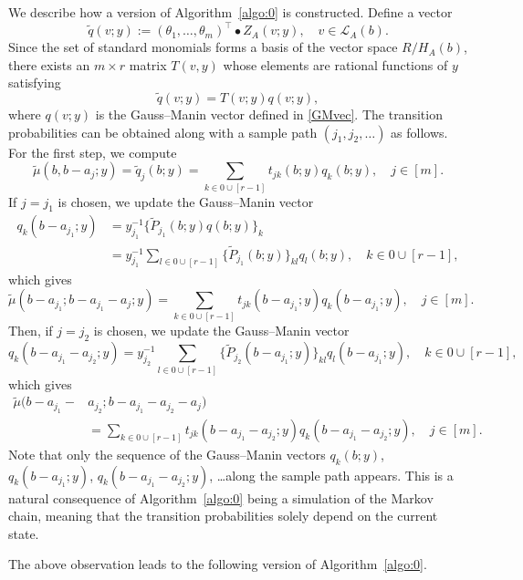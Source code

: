 \documentclass[a4paper,12pt]{article}
\theoremstyle{plain}
\theoremstyle{remark}
\begin{document}
We describe how a version of Algorithm~\ref{algo:0} is constructed.
Define a vector
\[
  \tilde{q}(v;y):=(\theta_1,\ldots,\theta_m)^\top\bullet Z_A(v;y),
  \quad v\in\mathcal{L}_A(b).
\]
Since the set of standard monomials forms a basis of the vector
space $R/H_A(b)$, there exists an $m\times r$ matrix $T(v,y)$
whose elements are rational functions of $y$ satisfying
\[
  \tilde{q}(v;y)=T(v;y)q(v;y),
\]
where $q(v;y)$ is the Gauss--Manin vector defined in \eqref{GMvec}.
The transition probabilities can be obtained along with a sample
path $(j_1,j_2,\ldots)$ as follows. For the first step, we compute
\[
  \tilde{\mu}(b,b-a_{j};y)=\tilde{q}_{j}(b;y)=
  \sum_{k\in 0\cup[r-1]}t_{jk}(b;y)q_k(b;y), \quad j\in[m].
\]
If $j=j_1$ is chosen, we update the Gauss--Manin vector
\begin{align*}
  q_k(b-a_{j_1};y)
  &=y_{j_1}^{-1}\{\tilde{P}_{j_1}(b;y)q(b;y)\}_k\\
  &=y_{j_1}^{-1}\sum_{l\in 0\cup[r-1]}\{\tilde{P}_{j_1}(b;y)\}_{kl}q_l(b;y),
  \quad k\in0\cup[r-1],
\end{align*}
which gives
\[
  \tilde{\mu}(b-a_{j_1};b-a_{j_1}-a_{j};y)=
  \sum_{k\in 0\cup[r-1]}t_{jk}(b-a_{j_1};y)q_k(b-a_{j_1};y),
  \quad j\in[m].
\]
Then, if $j=j_2$ is chosen, we update the Gauss--Manin vector
\[
  q_k(b-a_{j_1}-a_{j_2};y)
    =y_{j_2}^{-1}
    \sum_{l\in 0\cup[r-1]}\{\tilde{P}_{j_2}(b-a_{j_1};y)\}_{kl}
    q_l(b-a_{j_1};y), \quad k\in0\cup[r-1],
\]
which gives
\begin{align*}
  \tilde{\mu}(b-a_{j_1}-&a_{j_2};b-a_{j_1}-a_{j_2}-a_j)\\
  &=\sum_{k\in 0\cup[r-1]}t_{jk}(b-a_{j_1}-a_{j_2};y)
  q_k(b-a_{j_1}-a_{j_2};y),\quad j\in[m].
\end{align*}
Note that only the sequence of the Gauss--Manin vectors
$q_k(b;y)$, $q_k(b-a_{j_1};y)$, $q_k(b-a_{j_1}-a_{j_2};y)$,
\ldots along the sample path appears. This is a natural
consequence of Algorithm~\ref{algo:0} being a simulation
of the Markov chain, meaning that the transition probabilities
solely depend on the current state.

The above observation leads to the following version of
Algorithm~\ref{algo:0}.
\end{document}
